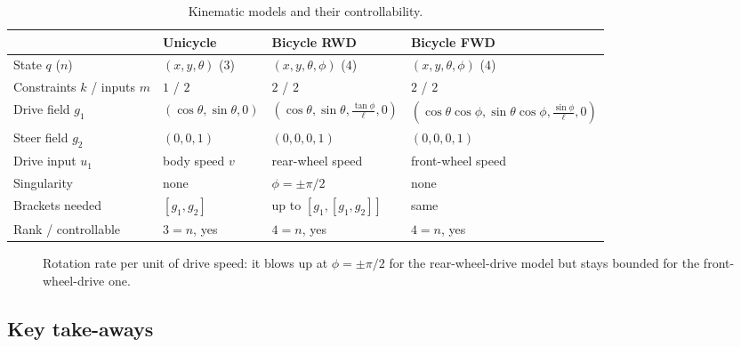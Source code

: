 \documentclass[11pt,a4paper]{article}
\newcommand{\LB}[2]{[#1,#2]}
\theoremstyle{definition}
\theoremstyle{plain}
\theoremstyle{remark}
\begin{document}
\begin{table}[ht]
\centering
\footnotesize
\setlength{\tabcolsep}{4pt}
\renewcommand{\arraystretch}{1.35}
\begin{tabular}{@{}p{2.6cm}p{3.0cm}p{3.7cm}p{4.3cm}@{}}
\toprule
 & \textbf{Unicycle} & \textbf{Bicycle RWD} & \textbf{Bicycle FWD}\\
\midrule
State $q$ ($n$) & $(x,y,\theta)$ ($3$) & $(x,y,\theta,\phi)$ ($4$) & $(x,y,\theta,\phi)$ ($4$)\\
Constraints $k$ / inputs $m$ & $1$ / $2$ & $2$ / $2$ & $2$ / $2$\\
Drive field $g_1$ & $(\cos\theta,\sin\theta,0)$ & $(\cos\theta,\sin\theta,\tfrac{\tan\phi}\ell,0)$ & $(\cos\theta\cos\phi,\sin\theta\cos\phi,\tfrac{\sin\phi}\ell,0)$\\
Steer field $g_2$ & $(0,0,1)$ & $(0,0,0,1)$ & $(0,0,0,1)$\\
Drive input $u_1$ & body speed $v$ & rear-wheel speed & front-wheel speed\\
Singularity & none & $\phi=\pm\pi/2$ & none\\
Brackets needed & $\LB{g_1}{g_2}$ & up to $\LB{g_1}{\LB{g_1}{g_2}}$ & same\\
Rank / controllable & $3=n$, yes & $4=n$, yes & $4=n$, yes\\
\bottomrule
\end{tabular}
\caption{Kinematic models and their controllability.}
\end{table}

\begin{figure}[H]
\centering
{}
\caption{Rotation rate per unit of drive speed: it blows up at $\phi=\pm\pi/2$ for the rear-wheel-drive model but stays bounded for the front-wheel-drive one.}
\end{figure}

\subsection{Key take-aways}
\end{document}
